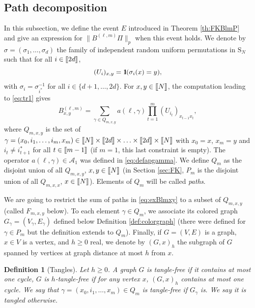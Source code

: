 \documentclass[11pt]{article}
\newtheorem{definition}[lemma]{Definition}
\newcommand{\cA}{\mathcal{A}}
\newcommand{\dS}{\mathrm{S}}
\newcommand{\1}{1\!\!{\sf I}}
\newcommand{\IND}{\1}
\newcommand{\INT}[1]{{{\left[\hspace{-1.4pt}\left[#1\right]\hspace{-1.4pt}\right]}}}
\begin{document}
\subsection{Path decomposition}
\label{subsec:PDP}

In this subsection, we define the event $E$ introduced in Theorem \ref{th:FKBlmP} and give an expression for $\| B^{(\ell,m)} \Pi \|_p$ when this event holds. We denote by $\sigma = (\sigma_1,\ldots,\sigma_d)$ the family of independent random uniform permutations in $\dS_N$ such that for all $i \in \INT{2d}$,
$$
(U_i)_{x,y} = \IND (\sigma_i (x) = y),
$$
with $\sigma_i = \sigma_{i^*}^{-1}$ for all $i \in \{d+1,\ldots,2d \}$. For $x,y \in \INT{N}$, the computation leading to \eqref{eq:tr1} gives 
\begin{equation}\label{eq:exBlmxy}
B^{(\ell,m)}_{x,y} =  \sum_{\gamma \in Q_{m,x,y}} a(\ell,\gamma) \prod_{t=1}^{m} (U_{i_t})_{x_{t-1} x_t} ,
\end{equation}
where $Q_{m,x,y}$ is the set of $\gamma = (x_0,i_1,\ldots,i_m,x_m)  \in \INT{N} \times \INT{2d} \times \ldots \times \INT{2d} \times \INT{N}$ with $x_0 = x$, $x_m = y$ and $i_{t} \ne i^*_{t+1}$ for all $t \in \INT{m-1}$ (if $m = 1$, this last constraint is empty). The operator $a(\ell,\gamma) \in \cA_1$ was defined in \eqref{eq:defapgamma}. We define $Q_m$ as the disjoint union of all $Q_{m,x,y}$, $x,y \in \INT{N}$ (in Section \ref{sec:FK}, $P_m$ is the disjoint union of all $Q_{m,x,x}$, $x \in \INT{N}$). Elements of $Q_m$ will be called \emph{paths}.

We are going to restrict the sum of paths in \eqref{eq:exBlmxy} to a subset of $Q_{m,x,y}$ (called $F_{m,x,y }$ below). To each element $\gamma \in Q_m$, we associate its colored graph $G_\gamma = (V_\gamma,E_\gamma)$ defined below Definition \ref{def:colorgraph} (there were defined for $\gamma \in P_m$ but the definition extends to $Q_m$). Finally, if $G = (V,E)$ is a graph, $x \in V$ is a vertex, and $h \geq 0$ real, we denote by $(G,x)_h$ the subgraph of $G$ spanned by vertices at graph distance at most $h$ from $x$.

\begin{definition}[Tangles]\label{def2}
Let $h \geq 0$. A graph $G$ is {\em tangle-free} if it contains at most one cycle, $G$ is {\em $h$-tangle-free} if for any vertex $x$, $(G,x)_{h}$ 
contains at most one cycle. We say that $\gamma  = (x_0,i_1,\ldots,x_m)\in Q_m$ is tangle-free
if $G_{\gamma}$ is. We say it is tangled otherwise.
\end{definition}
\end{document}
